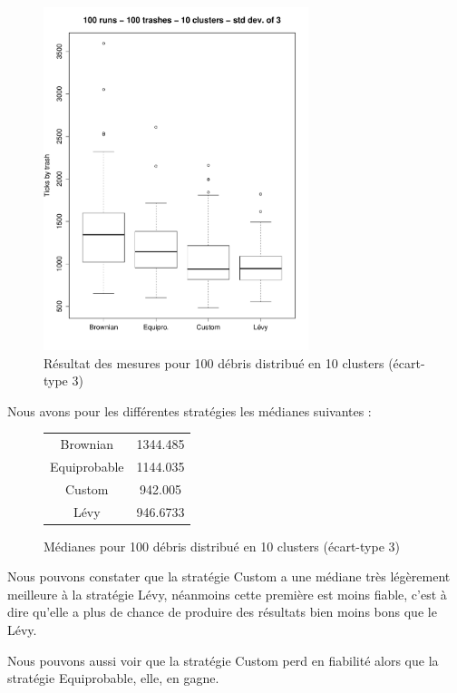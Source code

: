 

\begin{figure}[H]
	\begin{center}
		\includegraphics[height=10cm]{diagrams/100Tr10Clts_all.pdf}
		\caption{Résultat des mesures pour 100 débris distribué en 10 clusters (écart-type 3)}
		\label{fig:100Trashes_10Clusters}
	\end{center}
\end{figure}

Nous avons pour les différentes stratégies les médianes suivantes :

\begin{figure}[H]
	\begin{center}
		\begin{tabular}{ | c | c | }
			\hline
			Brownian & 1344.485 \\
			Equiprobable & 1144.035 \\
			Custom & 942.005 \\
			Lévy & 946.6733 \\
			\hline
		\end{tabular}
		\caption{Médianes pour 100 débris distribué en 10 clusters (écart-type 3)}
	\end{center}
\end{figure}


Nous pouvons constater que la stratégie Custom a une médiane très
légèrement meilleure à la stratégie Lévy, néanmoins cette première
est moins fiable, c'est à dire qu'elle a plus de chance de produire
des résultats bien moins bons que le Lévy.

Nous pouvons aussi voir que la stratégie Custom perd en fiabilité
alors que la stratégie Equiprobable, elle, en gagne.